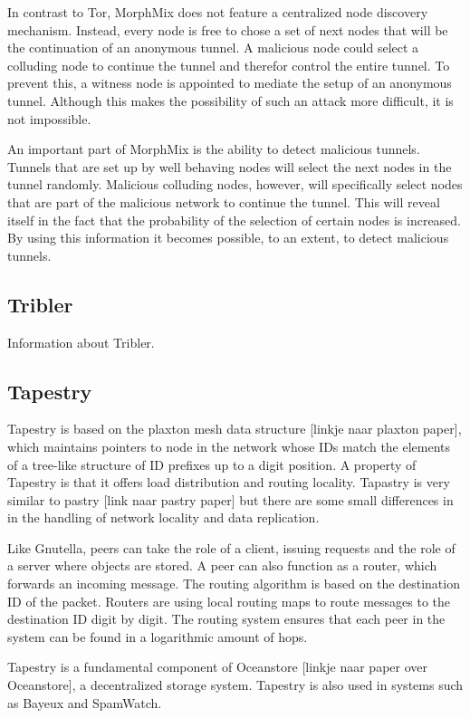 \documentclass[journal]{IEEEtran}
\begin{document}
			In contrast to Tor, MorphMix does not feature a centralized node discovery mechanism. Instead, every node is free to chose a set of next nodes that will be the continuation of an anonymous tunnel. A malicious node could select a colluding node to continue the tunnel and therefor control the entire tunnel. To prevent this, a witness node is appointed to mediate the setup of an anonymous tunnel. Although this makes the possibility of such an attack more difficult, it is not impossible.
			
			An important part of MorphMix is the ability to detect malicious tunnels. Tunnels that are set up by well behaving nodes will select the next nodes in the tunnel randomly. Malicious colluding nodes, however, will specifically select nodes that are part of the malicious network to continue the tunnel. This will reveal itself in the fact that the probability of the selection of certain nodes is increased. By using this information it becomes possible, to an extent, to detect malicious tunnels.
		
		\subsection{Tribler}
			Information about Tribler.
		
		\subsection{Tapestry}
			Tapestry is based on the plaxton mesh data structure [linkje naar plaxton paper], which maintains pointers to node in the network whose IDs match the elements of a tree-like structure of ID prefixes up to a digit position. A property of Tapestry is that it offers load distribution and routing locality. Tapastry is very similar to pastry [link naar pastry paper] but there are some small differences in in the handling of network locality and data replication.
		
			Like Gnutella, peers can take the role of a client, issuing requests and the role of a server where objects are stored. A peer can also function as a router, which forwards an incoming message. The routing algorithm is based on the destination ID of the packet. Routers are using local routing maps to route messages to the destination ID digit by digit. The routing system ensures that each peer in the system can be found in a logarithmic amount of hops.
		
			Tapestry is a fundamental component of Oceanstore [linkje naar paper over Oceanstore], a decentralized storage system. Tapestry is also used in systems such as Bayeux and SpamWatch.
		
\end{document}
